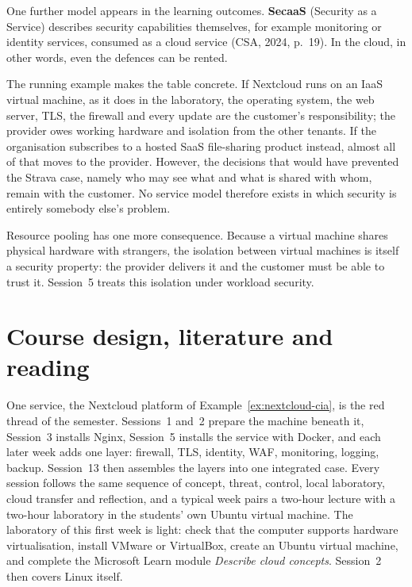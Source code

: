 One further model appears in the learning outcomes. \textbf{SecaaS} (Security
as a Service) describes security capabilities themselves, for example
monitoring or identity services, consumed as a cloud service (CSA, 2024,
p.~19). In the cloud, in other words, even the defences can be rented.

\begin{example}
The running example makes the table concrete. If Nextcloud runs on an IaaS
virtual machine, as it does in the laboratory, the operating system, the web
server, TLS, the firewall and every update are the customer's responsibility;
the provider owes working hardware and isolation from the other tenants. If the
organisation subscribes to a hosted SaaS file-sharing product instead, almost
all of that moves to the provider. However, the decisions that would have
prevented the Strava case, namely who may see what and what is shared with
whom, remain with the customer. No service model therefore exists in which
security is entirely somebody else's problem.
\end{example}

Resource pooling has one more consequence. Because a virtual machine shares
physical hardware with strangers, the isolation between virtual machines is
itself a security property: the provider delivers it and the customer must
be able to trust it. Session~5 treats this isolation under workload
security.

\section{Course design, literature and reading}

One service, the Nextcloud platform of Example~\ref{ex:nextcloud-cia}, is the
red thread of the semester. Sessions~1 and~2 prepare the machine beneath it,
Session~3 installs Nginx, Session~5 installs the service with Docker, and
each later week adds one layer: firewall, TLS, identity, WAF, monitoring,
logging, backup. Session~13 then assembles the layers into one integrated
case. Every session follows the same sequence
of concept, threat, control, local laboratory, cloud transfer and
reflection, and a typical week pairs a two-hour lecture with a two-hour
laboratory in the students' own Ubuntu virtual machine. The laboratory of
this first week is light: check that the computer supports hardware
virtualisation, install VMware or VirtualBox, create an Ubuntu virtual
machine, and complete the Microsoft Learn module \emph{Describe cloud
concepts}. Session~2 then covers Linux itself.

